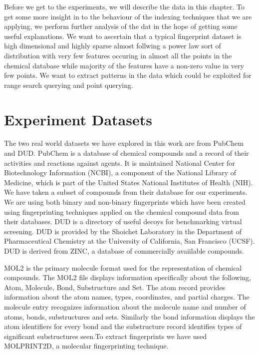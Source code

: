 Before we get to the experiments, we will describe the data in this chapter. To get some more insight in to the behaviour of the indexing techniques that we are applying, we perform further analysis of the dat in the hope of getting some useful explanations. We want to ascertain that a typical fingerprint dataset is high dimensional and highly sparse almost follwing a power law sort of distribution with very few features occuring in almost all the points in the chemical database while majority of the features have a non-zero value in very few points. We want to extract patterns in the data which could be exploited for range search querying and point querying.\\

\section{Experiment Datasets}

The two real world datasets we have explored in this work are from PubChem and DUD. PubChem is a database of chemical compounds and a record of their activities and reactions against agents. It is maintained National Center for Biotechnology Information (NCBI), a component of the National Library of Medicine, which is part of the United States National Institutes of Health (NIH). We have taken a subset of compounds from their database for our experiments. We are using both binary and non-binary fingerprints which have been created using fingerprinting techniques applied on the chemical compound data from their databases. DUD is a directory of useful decoys for benchmarking virtual screening. DUD is provided by the Shoichet Laboratory in the Department of Pharmaceutical Chemistry at the University of California, San Francisco (UCSF). DUD is derived from ZINC, a database of commercially avaiilable compounds. 

MOL2 is the primary molecule format used for the representation of chemical compounds. The MOL2 file displays information specifically about the following, Atom, Molecule, Bond, Substructure and Set. The atom record provides information about the atom names, types, coordinates, and partial charges. The molecule entry recognizes information about the molecule name and number of atoms, bonds, substructures and sets. Similarly the bond information displays the atom identifiers for every bond and the substructure record identifies types of significant substructures seen.To extract fingerprints we have used MOLPRINT2D, a molecular fingerprinting technique.

